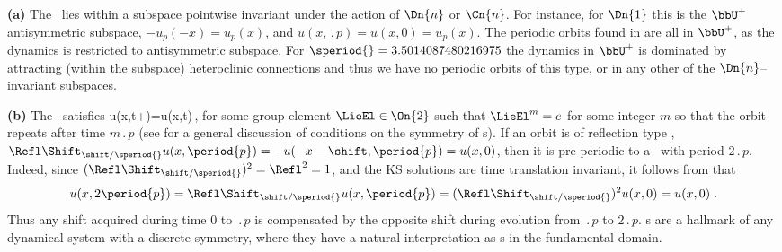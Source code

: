 {\bf (a)} The \po\ lies
within a subspace pointwise invariant under the action of
$\Dn{n}$ or $\Cn{n}$. For instance, for $\Dn{1}$ this is the
$\bbU^+$ antisymmetric subspace, $-u_p(-x) = u_p(x)$, and
$u(x,\period{p}) = u(x,0) = u_p(x)$. The periodic orbits
found in  are
all in $\bbU^+$, as the dynamics is restricted to
antisymmetric subspace. For $\speriod{}=3.5014087480216975$ the dynamics in $\bbU^+$
is dominated by attracting (within the subspace)
heteroclinic connections and thus we have no periodic orbits
of this type, or in any other of the $\Dn{n}$--invariant
subspaces.

{\bf (b)} The \po\ satisfies
\beq
	 u(x,t+)=\LieEl u(x,t)\,,
	\label{eq:POspattemp}
\eeq
for some group element $\LieEl\in \On{2}$ such that
$\LieEl^m=e$ for some integer $m$ so that the orbit repeats
after time $m \period{p}$ (see
 for a general discussion of
conditions on the symmetry of \po s).
If an orbit is of reflection type ,
$\Refl\Shift_{\shift/\speriod{}} u(x,\period{p}) =
-u(-x-\shift,\period{p}) = u(x,0)$, then it is pre-periodic
to a \po\ with period $2\period{p}$. Indeed, since
$(\Refl\Shift_{\shift/\speriod{}})^2 = \Refl^2 = 1$, and the KS
solutions are time translation invariant, it follows from
 that
\[
  u(x,2\period{p}) = \Refl\Shift_{\shift/\speriod{}} u(x,\period{p}) =
  (\Refl\Shift_{\shift/\speriod{}})^2 u(x,0) = u(x,0)\;.
\]
Thus any shift acquired during time $0$ to
$\period{p}$ is compensated by the opposite shift during
evolution from $\period{p}$ to $2 \period{p}$.
\Ppo s are a hallmark of any dynamical system
with a discrete symmetry, where they have a natural
interpretation as \po s in the fundamental
domain.



